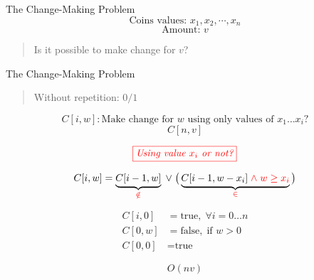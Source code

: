 
\begin{frame}{}
  \begin{exampleblock}{The Change-Making Problem}
    \[
      \text{Coins values: } x_{1}, x_{2}, \cdots, x_{n}
    \]
    \[
      \text{Amount: } v
    \]

    \vspace{0.30cm}
    \begin{quote}
      \centering
      Is it possible to make change for $v$?
    \end{quote}
  \end{exampleblock}

\end{frame}

\begin{frame}{}
  \begin{exampleblock}{The Change-Making Problem}
    \begin{quote}
      \centering
      Without repetition: $0/1$
    \end{quote}
  \end{exampleblock}

  \pause
  \[
    C[i, w]: \text{Make change for $w$ using only values of $x_{1} \dots x_{i}$?}
  \]
  \[
    C[n,v]
  \]

  \pause
  \[
    \textcolor{red}{\fbox{\it Using value $x_{i}$ or not?}}
  \]

  \[
    C[i,w] = \underbrace{C[i-1, w]}_{\textcolor{red}{\notin}} \;\lor\; \big(\underbrace{C[i-1, w-x_{i}] \textcolor{red}{\;\land\; w \ge x_{i}}}_{\textcolor{red}{\in}}\big)
  \]

  \pause
  \begin{align*}
    C[i,0] &= \text{true},  \; \forall i = 0 \dots n  \\
    C[0,w] &= \text{false}, \;\text{if } w > 0 \\
    C[0,0] &= \text{true}
  \end{align*}
  
  \[
    O(nv)
  \]
\end{frame}

